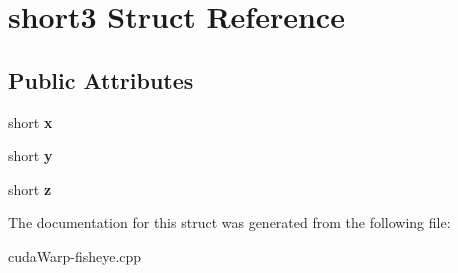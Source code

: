 \hypertarget{structshort3}{}\section{short3 Struct Reference}
\label{structshort3}
\subsection*{Public Attributes}
\begin{DoxyCompactItemize}
\item 
short {\bfseries x}\hypertarget{structshort3_a5d5d88cacca4de50a2334be0033a126a}{}\label{structshort3_a5d5d88cacca4de50a2334be0033a126a}

\item 
short {\bfseries y}\hypertarget{structshort3_a6056b3f7d064291aaf9121575ec83866}{}\label{structshort3_a6056b3f7d064291aaf9121575ec83866}

\item 
short {\bfseries z}\hypertarget{structshort3_a803658b690ee5726c60a2b99b99b9143}{}\label{structshort3_a803658b690ee5726c60a2b99b99b9143}

\end{DoxyCompactItemize}


The documentation for this struct was generated from the following file\+:\begin{DoxyCompactItemize}
\item 
cuda\+Warp-\/fisheye.\+cpp\end{DoxyCompactItemize}
